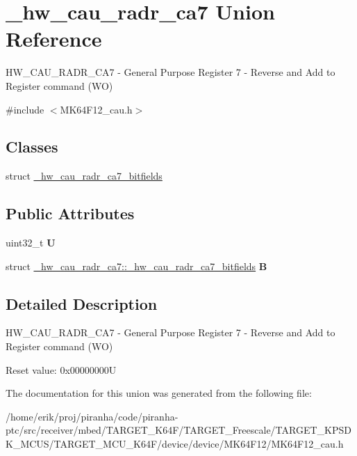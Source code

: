 \hypertarget{union__hw__cau__radr__ca7}{}\section{\+\_\+hw\+\_\+cau\+\_\+radr\+\_\+ca7 Union Reference}
\label{union__hw__cau__radr__ca7}


H\+W\+\_\+\+C\+A\+U\+\_\+\+R\+A\+D\+R\+\_\+\+C\+A7 -\/ General Purpose Register 7 -\/ Reverse and Add to Register command (WO)  




{\ttfamily \#include $<$M\+K64\+F12\+\_\+cau.\+h$>$}

\subsection*{Classes}
\begin{DoxyCompactItemize}
\item 
struct \hyperlink{struct__hw__cau__radr__ca7_1_1__hw__cau__radr__ca7__bitfields}{\+\_\+hw\+\_\+cau\+\_\+radr\+\_\+ca7\+\_\+bitfields}
\end{DoxyCompactItemize}
\subsection*{Public Attributes}
\begin{DoxyCompactItemize}
\item 
uint32\+\_\+t {\bfseries U}\hypertarget{union__hw__cau__radr__ca7_a6b9639bc84469ea3a3adb4903ae06bb3}{}\label{union__hw__cau__radr__ca7_a6b9639bc84469ea3a3adb4903ae06bb3}

\item 
struct \hyperlink{struct__hw__cau__radr__ca7_1_1__hw__cau__radr__ca7__bitfields}{\+\_\+hw\+\_\+cau\+\_\+radr\+\_\+ca7\+::\+\_\+hw\+\_\+cau\+\_\+radr\+\_\+ca7\+\_\+bitfields} {\bfseries B}\hypertarget{union__hw__cau__radr__ca7_a6ff8bf61875a8f8e7d42a089bc1944aa}{}\label{union__hw__cau__radr__ca7_a6ff8bf61875a8f8e7d42a089bc1944aa}

\end{DoxyCompactItemize}


\subsection{Detailed Description}
H\+W\+\_\+\+C\+A\+U\+\_\+\+R\+A\+D\+R\+\_\+\+C\+A7 -\/ General Purpose Register 7 -\/ Reverse and Add to Register command (WO) 

Reset value\+: 0x00000000U 

The documentation for this union was generated from the following file\+:\begin{DoxyCompactItemize}
\item 
/home/erik/proj/piranha/code/piranha-\/ptc/src/receiver/mbed/\+T\+A\+R\+G\+E\+T\+\_\+\+K64\+F/\+T\+A\+R\+G\+E\+T\+\_\+\+Freescale/\+T\+A\+R\+G\+E\+T\+\_\+\+K\+P\+S\+D\+K\+\_\+\+M\+C\+U\+S/\+T\+A\+R\+G\+E\+T\+\_\+\+M\+C\+U\+\_\+\+K64\+F/device/device/\+M\+K64\+F12/M\+K64\+F12\+\_\+cau.\+h\end{DoxyCompactItemize}
